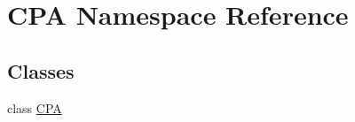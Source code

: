 \hypertarget{namespaceCPA}{
\section{CPA Namespace Reference}
\label{namespaceCPA}
}
\subsection*{Classes}
\begin{DoxyCompactItemize}
\item 
class \hyperlink{classCPA_1_1CPA}{CPA}
\end{DoxyCompactItemize}
